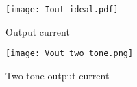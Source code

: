\begin{appendices}
\begin{figure}[h] 
\texttt{[image: Iout\_ideal.pdf]}
\caption{Output current}
\label{fig:Output current}
\end{figure}

\begin{figure}[h] 
\texttt{[image: Vout\_two\_tone.png]}
\caption{Two tone output current}
\label{transient_two_tone}
\end{figure}
\end{appendices}